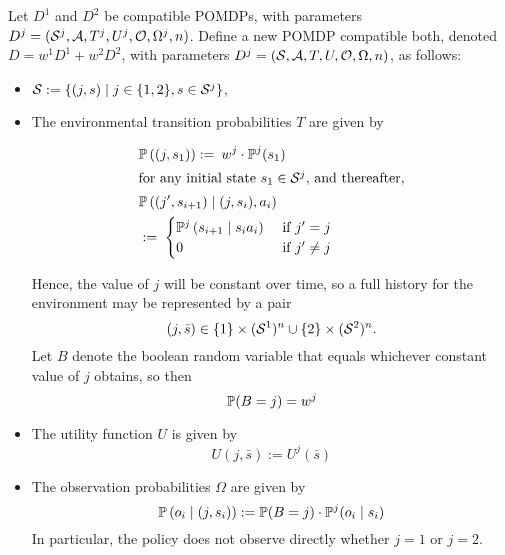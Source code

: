 \documentclass{article}
\newcommand{\seq}{\bar}
\newcommand{\bool}{B}
\begin{document}
\begin{definition}\label{defn:mixture} Let $D^1$ and $D^2$ be compatible POMDPs, with parameters 
$D^j = (\mathcal{S}^j,\mathcal{A},T^j, U^j, \mathcal{O}, \Omega^j, n)$.  Define a new POMDP compatible both, denoted $D=w^1D^1 + w^2D^2$, with parameters 
$D^j = (\mathcal{S},\mathcal{A},T, U, \mathcal{O}, \Omega, n)$, as follows:
\begin{itemize}
\item $\mathcal{S}:= \{(j,s) \mid j\in\{1,2\}, s\in\mathcal{S}^j\}$,
\item The environmental transition probabilities $T$ are given by

\begin{align*}
& \mathbb{P}\left((j,s_1)\right) := \: w^j\cdot \mathbb{P}^j(s_1)\\
\intertext{for any initial state $s_1\in\mathcal{S}^j$, and thereafter,}
& \mathbb{P}\left((j',s_{i+1}) \mid (j,s_i), a_i \right) & \\
& := \;
\begin{cases}
\mathbb{P}^j\left(s_{i+1} \mid s_ia_i\right) &\mbox{ if $j'=j$}\\
0 & \mbox { if $j'\neq j$}
\end{cases}
\end{align*}

Hence, the value of $j$ will be constant over time, so a full history for the environment may be represented by a pair
\[
(j,\seq s) \in \{1\}\times (\Ss^1)^n \cup \{2\}\times(\Ss^2)^n.
\]
Let $\bool $ denote the boolean random variable that equals whichever constant value of $j$ obtains, so then
\[
\PP(\bool =j) = w^j
\]
\item The utility function $U$ is given by
\[
U(j,\seq s) := U^j(\seq s)
\]
\item The observation probabilities $\Omega$ are given by
\[
\PP\left(o_i \mid (j,s_i)\right) := \PP(\bool =j) \cdot \PP^j(o_i \mid s_i)
\]
In particular, the policy does not observe directly whether $j=1$ or $j=2$.
\end{itemize}

\end{definition}
\end{document}
